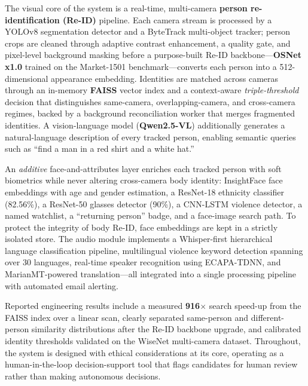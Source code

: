 \documentclass[12pt]{report}
\begin{document}
\vspace{0.5em}
\noindent The visual core of the system is a real-time, multi-camera \textbf{person re-identification (Re-ID)} pipeline. Each camera stream is processed by a YOLOv8 segmentation detector and a ByteTrack multi-object tracker; person crops are cleaned through adaptive contrast enhancement, a quality gate, and pixel-level background masking before a purpose-built Re-ID backbone---\textbf{OSNet x1.0} trained on the Market-1501 benchmark---converts each person into a 512-dimensional appearance embedding. Identities are matched across cameras through an in-memory \textbf{FAISS} vector index and a context-aware \emph{triple-threshold} decision that distinguishes same-camera, overlapping-camera, and cross-camera regimes, backed by a background reconciliation worker that merges fragmented identities. A vision-language model (\textbf{Qwen2.5-VL}) additionally generates a natural-language description of every tracked person, enabling semantic queries such as ``find a man in a red shirt and a white hat.''

\vspace{0.5em}
\noindent An \emph{additive} face-and-attributes layer enriches each tracked person with soft biometrics while never altering cross-camera body identity: InsightFace face embeddings with age and gender estimation, a ResNet-18 ethnicity classifier (82.56\%), a ResNet-50 glasses detector (90\%), a CNN-LSTM violence detector, a named watchlist, a ``returning person'' badge, and a face-image search path. To protect the integrity of body Re-ID, face embeddings are kept in a strictly isolated store. The audio module implements a Whisper-first hierarchical language classification pipeline, multilingual violence keyword detection spanning over 30 languages, real-time speaker recognition using ECAPA-TDNN, and MarianMT-powered translation---all integrated into a single processing pipeline with automated email alerting.

\vspace{0.5em}
\noindent Reported engineering results include a measured \textbf{916$\times$} search speed-up from the FAISS index over a linear scan, clearly separated same-person and different-person similarity distributions after the Re-ID backbone upgrade, and calibrated identity thresholds validated on the WiseNet multi-camera dataset. Throughout, the system is designed with ethical considerations at its core, operating as a human-in-the-loop decision-support tool that flags candidates for human review rather than making autonomous decisions.
\end{document}
